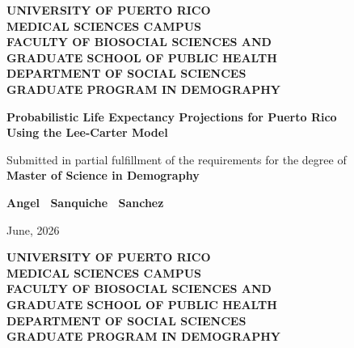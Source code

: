 \thispagestyle{empty}
\begin{center}
  \vspace*{0.5cm}

  {\fontsize{12}{14}\selectfont\bfseries
    UNIVERSITY OF PUERTO RICO \\[4pt]
    MEDICAL SCIENCES CAMPUS \\[4pt]
    FACULTY OF BIOSOCIAL SCIENCES AND \\[4pt]
    GRADUATE SCHOOL OF PUBLIC HEALTH \\[4pt]
    DEPARTMENT OF SOCIAL SCIENCES \\[4pt]
    GRADUATE PROGRAM IN DEMOGRAPHY
  }

  \vspace{2.5cm}

  {\fontsize{14}{18}\selectfont\bfseries
    Probabilistic Life Expectancy Projections for Puerto Rico \\[6pt]
    Using the Lee-Carter Model
  }

  \vspace{2.5cm}

  {\fontsize{12}{15}\selectfont
    Submitted in partial fulfillment of the requirements for the degree of \\[6pt]
    \textbf{Master of Science in Demography}
  }

  \vspace{2.5cm}

  {\fontsize{12}{14}\selectfont\bfseries
    Angel \ Sanquiche \ Sanchez
  }

  \vspace{0.5cm}

  {\fontsize{12}{14}\selectfont
    June, 2026
  }

\end{center}

\newpage

\thispagestyle{empty}
\begin{center}

  {\fontsize{12}{14}\selectfont\bfseries
    UNIVERSITY OF PUERTO RICO \\[4pt]
    MEDICAL SCIENCES CAMPUS \\[4pt]
    FACULTY OF BIOSOCIAL SCIENCES AND \\[4pt]
    GRADUATE SCHOOL OF PUBLIC HEALTH \\[4pt]
    DEPARTMENT OF SOCIAL SCIENCES \\[4pt]
    GRADUATE PROGRAM IN DEMOGRAPHY
  }

\end{center}

